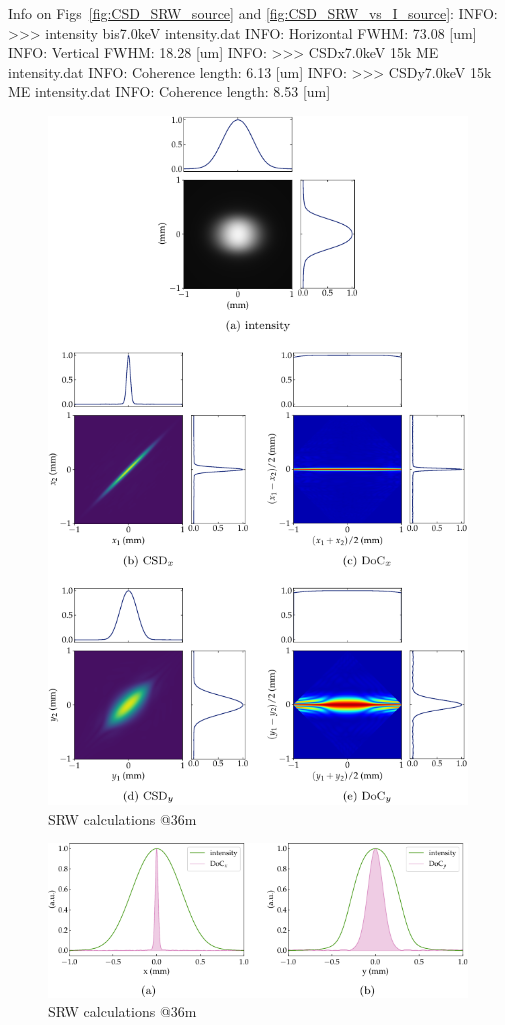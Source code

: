 \documentclass{iucr}              %
\newcommand{\inred}[1]{{\color{red}#1}}
\begin{document}
\inred{Info on Figs~\ref{fig:CSD_SRW_source} and \ref{fig:CSD_SRW_vs_I_source}:}
INFO: >>> intensity bis7.0keV intensity.dat
INFO: Horizontal FWHM: 73.08 [um]
INFO: Vertical FWHM: 18.28 [um]
INFO: >>> CSDx7.0keV 15k ME intensity.dat
INFO: Coherence length: 6.13 [um]
INFO: >>> CSDy7.0keV 15k ME intensity.dat
INFO: Coherence length: 8.53 [um]


\begin{figure}
    \label{fig:CSD_SRW_36m}
    \includegraphics[width=0.99\textwidth]{SRW_CSD_36m.pdf}
    \caption{SRW calculations @36m}
\end{figure}
\begin{figure}
    \label{fig:CSD_SRW_vs_I_36m}
    \includegraphics[width=0.99\textwidth]{CSD_SRW_vs_I_36m.pdf}
    \caption{SRW calculations @36m}
\end{figure}
\end{document}
